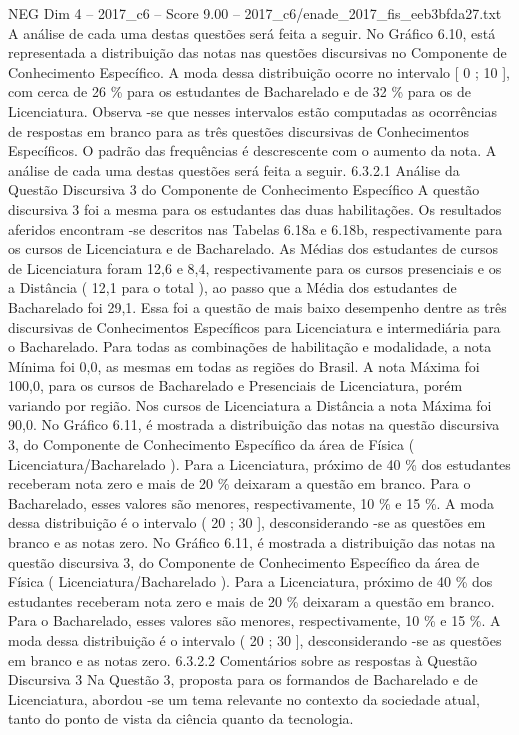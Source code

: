 \begin{textsample}{NEG Dim 4 – 2017\_c6 – Score 9.00 – 2017\_c6/enade\_2017\_fis\_eeb3bfda27.txt}
A análise de cada uma destas questões será feita a seguir.
No Gráfico 6.10, está representada a distribuição das notas nas questões discursivas no Componente de Conhecimento Específico.
A moda dessa distribuição ocorre no intervalo [ 0 ; 10 ], com cerca de 26 \% para os estudantes de Bacharelado e de 32 \% para os de Licenciatura.
Observa -se que nesses intervalos estão computadas as ocorrências de respostas em branco para as três questões discursivas de Conhecimentos Específicos.
O padrão das frequências é descrescente com o aumento da nota.
A análise de cada uma destas questões será feita a seguir. 6.3.2.1 Análise da Questão Discursiva 3 do Componente de Conhecimento Específico A questão discursiva 3 foi a mesma para os estudantes das duas habilitações.
Os resultados aferidos encontram -se descritos nas Tabelas 6.18a e 6.18b, respectivamente para os cursos de Licenciatura e de Bacharelado.
As Médias dos estudantes de cursos de Licenciatura foram 12,6 e 8,4, respectivamente para os cursos presenciais e os a Distância ( 12,1 para o total ), ao passo que a Média dos estudantes de Bacharelado foi 29,1.
Essa foi a questão de mais baixo desempenho dentre as três discursivas de Conhecimentos Específicos para Licenciatura e intermediária para o Bacharelado.
Para todas as combinações de habilitação e modalidade, a nota Mínima foi 0,0, as mesmas em todas as regiões do Brasil.
A nota Máxima foi 100,0, para os cursos de Bacharelado e Presenciais de Licenciatura, porém variando por região.
Nos cursos de Licenciatura a Distância a nota Máxima foi 90,0.
No Gráfico 6.11, é mostrada a distribuição das notas na questão discursiva 3, do Componente de Conhecimento Específico da área de Física ( Licenciatura/Bacharelado ).
Para a Licenciatura, próximo de 40 \% dos estudantes receberam nota zero e mais de 20 \% deixaram a questão em branco.
Para o Bacharelado, esses valores são menores, respectivamente, 10 \% e 15 \%.
A moda dessa distribuição é o intervalo ( 20 ; 30 ], desconsiderando -se as questões em branco e as notas zero.
No Gráfico 6.11, é mostrada a distribuição das notas na questão discursiva 3, do Componente de Conhecimento Específico da área de Física ( Licenciatura/Bacharelado ).
Para a Licenciatura, próximo de 40 \% dos estudantes receberam nota zero e mais de 20 \% deixaram a questão em branco.
Para o Bacharelado, esses valores são menores, respectivamente, 10 \% e 15 \%.
A moda dessa distribuição é o intervalo ( 20 ; 30 ], desconsiderando -se as questões em branco e as notas zero. 6.3.2.2 Comentários sobre as respostas à Questão Discursiva 3 Na Questão 3, proposta para os formandos de Bacharelado e de Licenciatura, abordou -se um tema relevante no contexto da sociedade atual, tanto do ponto de vista da ciência quanto da tecnologia.

\end{textsample}

